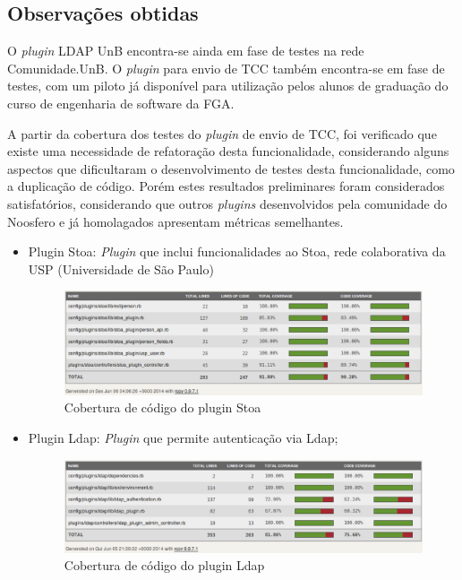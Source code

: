 \begin{enumerate}
\subsection{Observações obtidas}

O \textit{plugin} LDAP UnB encontra-se ainda em fase de testes na rede Comunidade.UnB. 
%
O \textit{plugin} para envio de TCC também encontra-se em fase de testes, com um piloto já disponível para utilização pelos alunos de graduação do curso de engenharia de software da FGA.

A partir da cobertura dos testes do \textit{plugin} de envio de TCC, foi verificado que existe uma necessidade de refatoração desta funcionalidade, considerando alguns aspectos que dificultaram o desenvolvimento de testes desta funcionalidade, como a duplicação de código.
%
Porém estes resultados preliminares foram considerados satisfatórios, considerando que outros \textit{plugins} desenvolvidos pela comunidade do Noosfero e já homolagados apresentam métricas semelhantes.

\begin{itemize}
\item Plugin Stoa: \textit{Plugin} que inclui funcionalidades ao Stoa, rede colaborativa da USP (Universidade de São Paulo)

\begin{figure}[!h]
    \centering
    \includegraphics[keepaspectratio=false,scale=0.45]
      {figuras/stoa.eps}
    \caption{Cobertura de código do plugin Stoa}
    \label{consideracoes_cobertura3}
\end{figure}

\item Plugin Ldap: \textit{Plugin} que permite autenticação via Ldap;

\begin{figure}[!h]
    \centering
    \includegraphics[keepaspectratio=false,scale=0.45]
      {figuras/ldap.eps}
    \caption{Cobertura de código do plugin Ldap}
    \label{consideracoes_cobertura4}
\end{figure}


\end{itemize}
\end{enumerate}
